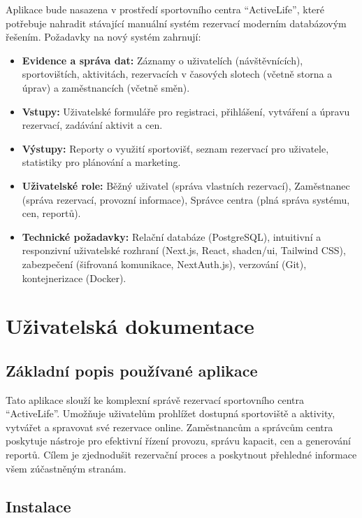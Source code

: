 \documentclass[12pt, a4paper]{article}
\begin{document}
Aplikace bude nasazena v prostředí sportovního centra ``ActiveLife'', které potřebuje nahradit stávající manuální systém rezervací moderním databázovým řešením. Požadavky na nový systém zahrnují:

\begin{itemize}
    \item \textbf{Evidence a správa dat:} Záznamy o uživatelích (návštěvnících), sportovištích, aktivitách, rezervacích v časových slotech (včetně storna a úprav) a zaměstnancích (včetně směn).
    \item \textbf{Vstupy:} Uživatelské formuláře pro registraci, přihlášení, vytváření a úpravu rezervací, zadávání aktivit a cen.
    \item \textbf{Výstupy:} Reporty o využití sportovišť, seznam rezervací pro uživatele, statistiky pro plánování a marketing.
    \item \textbf{Uživatelské role:} Běžný uživatel (správa vlastních rezervací), Zaměstnanec (správa rezervací, provozní informace), Správce centra (plná správa systému, cen, reportů).
    \item \textbf{Technické požadavky:} Relační databáze (PostgreSQL), intuitivní a responzivní uživatelské rozhraní (Next.js, React, shadcn/ui, Tailwind CSS), zabezpečení (šifrovaná komunikace, NextAuth.js), verzování (Git), kontejnerizace (Docker).
\end{itemize}

\section{Uživatelská dokumentace}
\label{sec:uzivatelska_dokumentace}

\subsection{Základní popis používané aplikace}
\label{subsec:zakladni_popis}

Tato aplikace slouží ke komplexní správě rezervací sportovního centra ``ActiveLife''. Umožňuje uživatelům prohlížet dostupná sportoviště a aktivity, vytvářet a spravovat své rezervace online. Zaměstnancům a správcům centra poskytuje nástroje pro efektivní řízení provozu, správu kapacit, cen a generování reportů. Cílem je zjednodušit rezervační proces a poskytnout přehledné informace všem zúčastněným stranám.

\subsection{Instalace}
\label{subsec:instalace}
\end{document}
